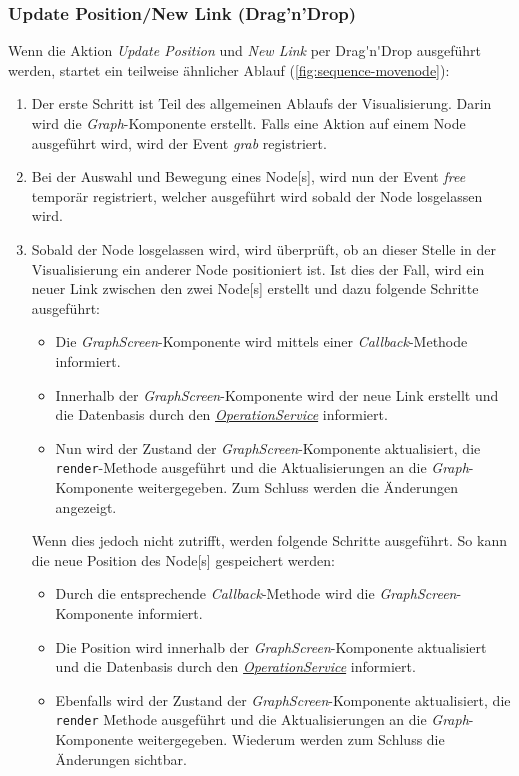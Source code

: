 \subsubsection{Update Position/New Link (Drag'n'Drop)}
Wenn die Aktion \textit{Update Position} und \textit{New Link} per \gls{Drag'n'Drop} ausgeführt werden, startet ein teilweise ähnlicher Ablauf (\autoref{fig:sequence-movenode}):
\begin{enumerate}
    \item Der erste Schritt ist Teil des allgemeinen Ablaufs der Visualisierung. Darin wird die \textit{Graph}-Komponente erstellt. Falls eine Aktion auf einem \gls{Node} ausgeführt wird, wird der \gls{Event} \textit{grab} registriert.
    \item Bei der Auswahl und Bewegung eines \gls{Node}[s], wird nun der \gls{Event} \textit{free} temporär registriert, welcher ausgeführt wird sobald der \gls{Node} losgelassen wird.
    \item Sobald der \gls{Node} losgelassen wird, wird überprüft, ob an dieser Stelle in der Visualisierung ein anderer \gls{Node} positioniert ist. Ist dies der Fall, wird ein neuer \gls{Link} zwischen den zwei \gls{Node}[s] erstellt und dazu folgende Schritte ausgeführt:  
        \begin{itemize}
            \item Die \textit{GraphScreen}-Komponente wird mittels einer \textit{Callback}-Meth\-ode informiert.
            \item Innerhalb der \textit{GraphScreen}-Komponente wird der neue \gls{Link} erstellt und die Datenbasis durch den \hyperref[OperationService]{\textit{OperationService}} informiert.
            \item Nun wird der Zustand der \textit{GraphScreen}-Komponente aktualisiert, die \texttt{render}-Methode ausgeführt und die Aktualisierungen an die \textit{Graph}-Komponente weitergegeben. Zum Schluss werden die Änderungen angezeigt.    
        \end{itemize}
    Wenn dies jedoch nicht zutrifft, werden folgende Schritte ausgeführt. So kann die neue Position des \gls{Node}[s] gespeichert werden: 
        \begin{itemize}
            \item Durch die entsprechende \textit{Callback}-Methode wird die \textit{GraphScreen}-Komponente informiert.
            \item Die Position wird innerhalb der \textit{GraphScreen}-Komponente aktualisiert und die Datenbasis durch den \hyperref[OperationService]{\textit{OperationService}} informiert.
            \item Ebenfalls wird der Zustand der \textit{GraphScreen}-Komponente aktualisiert, die \texttt{render} Methode ausgeführt und die Aktualisierungen an die \textit{Graph}-Komponente weitergegeben. Wiederum werden zum Schluss die Änderungen sichtbar.
        \end{itemize}
\end{enumerate}

